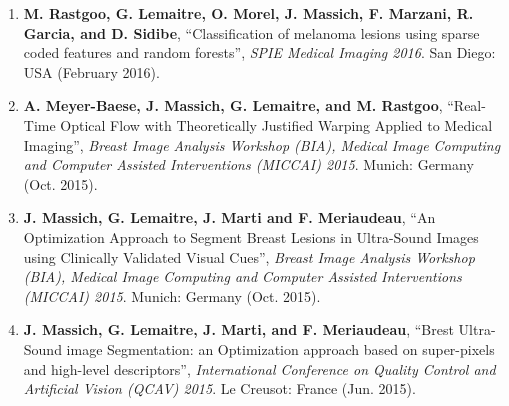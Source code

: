 \begin{publication}
\begin{enumerate}
\item \textbf{M. Rastgoo, G. Lemaitre, O. Morel, J. Massich, F. Marzani, R. Garcia, and D. Sidibe}, ``Classification of melanoma lesions using sparse coded features and random forests'', \textit{SPIE Medical Imaging 2016}. San Diego: USA (February 2016).
\item \textbf{A. Meyer-Baese, J. Massich, G. Lemaitre, and M. Rastgoo}, ``Real-Time Optical Flow with Theoretically Justified Warping Applied to Medical Imaging'', \textit{Breast Image Analysis Workshop (BIA), Medical Image Computing and Computer Assisted Interventions (MICCAI) 2015}. Munich: Germany (Oct. 2015).
\item \textbf{J. Massich, G. Lemaitre, J. Marti and F. Meriaudeau}, ``An Optimization Approach to Segment Breast Lesions in Ultra-Sound Images using Clinically Validated Visual Cues'', \textit{Breast Image Analysis Workshop (BIA), Medical Image Computing and Computer Assisted Interventions (MICCAI) 2015}. Munich: Germany (Oct. 2015).
\item \textbf{J. Massich, G. Lemaitre, J. Marti, and F. Meriaudeau}, ``Brest Ultra-Sound image Segmentation: an Optimization approach based on super-pixels and high-level descriptors'', \textit{International Conference on Quality Control and Artificial Vision (QCAV) 2015}. Le Creusot: France (Jun. 2015).
\end{enumerate}

\end{publication}
